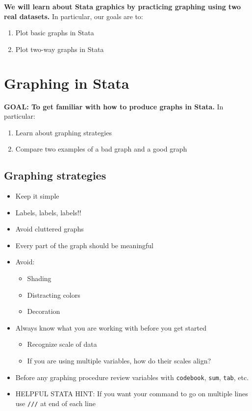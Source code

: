 \documentclass[
]{book}
\providecommand{\tightlist}{%
  \setlength{\itemsep}{0pt}\setlength{\parskip}{0pt}}
\begin{document}
\textbf{We will learn about Stata graphics by practicing graphing using two real datasets.} In particular, our goals are to:

\begin{enumerate}
\def\labelenumi{\arabic{enumi}.}
\tightlist
\item
  Plot basic graphs in Stata
\item
  Plot two-way graphs in Stata
\end{enumerate}

\hypertarget{graphing-in-stata}{%
\section{Graphing in Stata}\label{graphing-in-stata}}

\textbf{GOAL: To get familiar with how to produce graphs in Stata.} In particular:

\begin{enumerate}
\def\labelenumi{\arabic{enumi}.}
\tightlist
\item
  Learn about graphing strategies
\item
  Compare two examples of a bad graph and a good graph
\end{enumerate}

\hypertarget{graphing-strategies}{%
\subsection{Graphing strategies}\label{graphing-strategies}}

\begin{itemize}
\tightlist
\item
  Keep it simple
\item
  Labels, labels, labels!!
\item
  Avoid cluttered graphs
\item
  Every part of the graph should be meaningful
\item
  Avoid:

  \begin{itemize}
  \tightlist
  \item
    Shading
  \item
    Distracting colors
  \item
    Decoration
  \end{itemize}
\item
  Always know what you are working with before you get started

  \begin{itemize}
  \tightlist
  \item
    Recognize scale of data
  \item
    If you are using multiple variables, how do their scales align?
  \end{itemize}
\item
  Before any graphing procedure review variables with \texttt{codebook}, \texttt{sum}, \texttt{tab}, etc.
\item
  HELPFUL STATA HINT: If you want your command to go on multiple lines use \texttt{///} at end of each line
\end{itemize}
\end{document}
